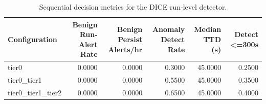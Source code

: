 \begin{table}[t]
\centering
\caption{Sequential decision metrics for the DICE run-level detector.}
\label{tab:dice_sequential_metrics}
\footnotesize
\begin{tabular}{lrrrrr}
\toprule
Configuration & Benign Run-Alert Rate & Benign Persist Alerts/hr & Anomaly Detect Rate & Median TTD (s) & Detect <=300s \\
\midrule
tier0 & 0.0000 & 0.0000 & 0.3000 & 45.0000 & 0.2500 \\
tier0_tier1 & 0.0000 & 0.0000 & 0.5500 & 45.0000 & 0.3500 \\
tier0_tier1_tier2 & 0.0000 & 0.0000 & 0.6500 & 45.0000 & 0.4000 \\
\bottomrule
\end{tabular}

\end{table}
